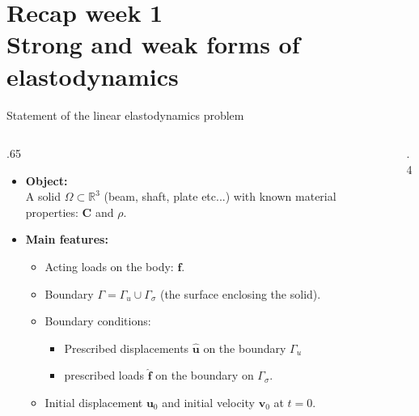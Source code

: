 \documentclass[aspectratio=169]{beamer}
\begin{document}
\section{Recap week 1 \\ Strong and weak forms of elastodynamics}
 {

  \begin{frame}{Statement of the linear elastodynamics problem}
    \begin{columns}[T]
      \begin{column}{.65\textwidth}
        \begin{itemize}
          \item \textbf{Object:} \\ A solid $\Omega\subset\mathbb R^{3}$ (beam, shaft, plate etc...) with known material properties: $\mathbf C$ and $\rho$.
                \vspace{0.3cm}
          \item \textbf{Main features:}
                \begin{itemize}
                  \item Acting loads on the body: $\mathbf f$.
                        \vspace{0.1cm}
                  \item Boundary $\Gamma=\Gamma_{u}\cup\Gamma_{\sigma}$ (the surface enclosing the solid).
                        \vspace{0.1cm}
                  \item Boundary conditions: \begin{itemize}
                          \item Prescribed displacements $\mathbf{\hat u}$ on the boundary $\Gamma_{u}$ \item  prescribed loads $\mathbf{\hat f}$ on the boundary on $\Gamma_{\sigma}$.
                                \vspace{0.1cm}
                        \end{itemize}
                  \item Initial displacement $\mathbf u_0$ and initial velocity $\mathbf v_0$ at $t=0$.
                \end{itemize}
        \end{itemize}
      \end{column}
      \hfill
      \begin{column}{.4\textwidth}

\end{column}
\end{columns}
\end{frame}}
\end{document}
